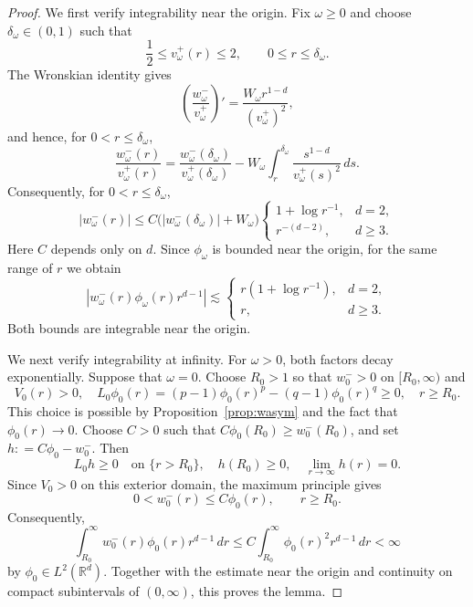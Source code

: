 \documentclass[12pt, a4paper, reqno]{amsart}
\numberwithin{equation}{section}
\theoremstyle{definition}
\theoremstyle{remark}
\newcommand{\R}{\mathbb R}
\newcommand{\ce}{\mathrel{\mathop:}=}
\begin{document}
\begin{proof}
We first verify integrability near the origin.
Fix $\omega\ge0$ and choose $\delta_\omega\in(0,1)$
such that
\[
  \frac12\le v_\omega^+(r)\le2,\qquad 0\le r\le \delta_\omega.
\]
The Wronskian identity gives
\[
  \left(\frac{w_\omega^-}{v_\omega^+}\right)'
  =\frac{W_\omega r^{1-d}}{(v_\omega^+)^2},
\]
and hence, for $0<r\le \delta_\omega$,
\[
  \frac{w_\omega^-(r)}{v_\omega^+(r)}
  =\frac{w_\omega^-(\delta_\omega)}{v_\omega^+(\delta_\omega)}
   -W_\omega\int_r^{\delta_\omega}\frac{s^{1-d}}{v_\omega^+(s)^2}\,ds.
\]
Consequently, for $0<r\le\delta_\omega$,
\begin{equation}\label{eq:wnear}
  |w_\omega^-(r)|
  \le C\bigl(|w_\omega^-(\delta_\omega)|+W_\omega\bigr)
  \begin{cases}
    1+\log r^{-1}, & d=2,\\
    r^{-(d-2)}, & d\ge3.
  \end{cases}
\end{equation}
Here $C$ depends only on $d$. Since $\phi_\omega$ is bounded near
the origin, for the same range of $r$ we obtain
\[
  |w_\omega^-(r)\phi_\omega(r)r^{d-1}|
  \lesssim
  \begin{cases}
    r(1+\log r^{-1}), & d=2,\\
    r, & d\ge3.
  \end{cases}
\]
Both bounds are integrable near the origin.

We next verify integrability at infinity. For $\omega>0$, both
factors decay exponentially. Suppose that $\omega=0$. Choose $R_0>1$
so that $w_0^->0$ on $[R_0,\infty)$ and
\[
  V_0(r)>0,\quad
  L_0\phi_0(r)
  =(p-1)\phi_0(r)^p-(q-1)\phi_0(r)^q\ge0,
  \quad r\ge R_0.
\]
This choice is possible by Proposition~\ref{prop:wasym}
and the fact that $\phi_0(r)\to0$. Choose $C>0$ such that
$C\phi_0(R_0)\ge w_0^-(R_0)$, and set $h\ce C\phi_0-w_0^-$.
Then
\[
  L_0h\ge0\quad\text{on }\{r>R_0\},\quad
  h(R_0)\ge0,\quad \lim_{r\to\infty}h(r)=0.
\]
Since $V_0>0$ on this exterior domain, the maximum principle gives
\[
  0<w_0^-(r)\le C\phi_0(r),\qquad r\ge R_0.
\]
Consequently,
\[
  \int_{R_0}^\infty w_0^-(r)\phi_0(r)r^{d-1}\,dr
  \le C\int_{R_0}^\infty\phi_0(r)^2r^{d-1}\,dr<\infty
\]
by $\phi_0\in L^2(\R^d)$. Together with the estimate near the
origin and continuity on compact subintervals of $(0,\infty)$,
this proves the lemma.
\end{proof}
\end{document}
